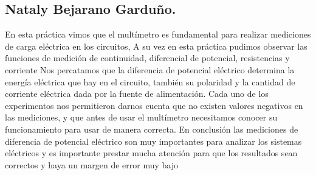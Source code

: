 \documentclass[10pt]{article}
\begin{document}
\begin{multicols}{2}
\subsection*{Nataly Bejarano Garduño.}

En esta práctica vimos que el multímetro es fundamental para realizar mediciones de carga eléctrica en los circuitos, A su vez en esta práctica pudimos observar las funciones de medición de continuidad, diferencial de potencial, resistencias y corriente 
Nos percatamos que la diferencia de potencial eléctrico determina la energía eléctrica que hay en el circuito, también su polaridad y la cantidad de corriente eléctrica dada por la fuente de alimentación. 
Cada uno de los experimentos nos permitieron darnos cuenta que no existen valores negativos en las mediciones, y que antes de usar el multímetro necesitamos conocer su funcionamiento para usar de manera correcta. 
En conclusión las mediciones de diferencia de potencial eléctrico son muy importantes para analizar los sistemas eléctricos y es importante prestar mucha atención para que los resultados sean correctos y haya un margen de error muy bajo

\end{multicols}
\end{document}

